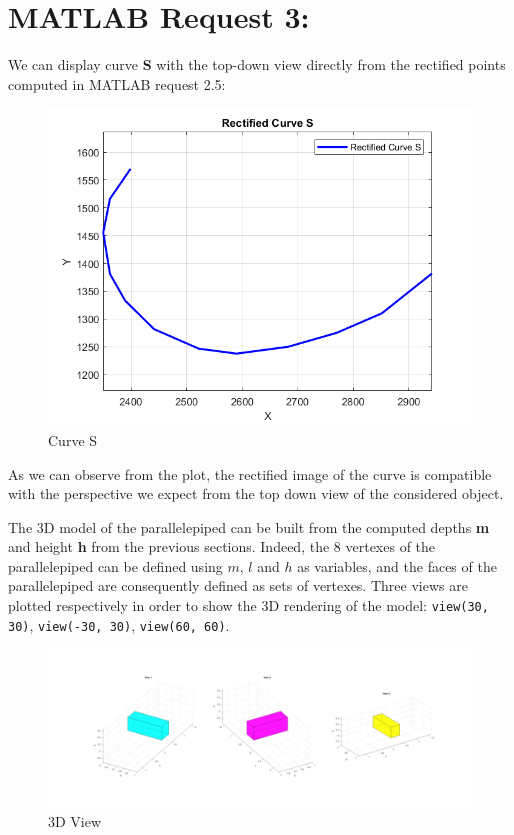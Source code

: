 \documentclass{Configuration_Files/PoliMi3i_thesis}
\begin{document}
\section{MATLAB Request 3: }
We can display curve \textbf{S} with the top-down view directly from the rectified points computed in MATLAB request 2.5:
\begin{figure}[H]
    \centering
    \includegraphics[width=0.5\linewidth]{Project Template/Images/s.png}
    \caption{Curve S}
    \label{fig:enter-label}
\end{figure}
As we can observe from the plot, the rectified image of the curve is compatible with the perspective we expect from the top down view of the considered object.

The 3D model of the parallelepiped can be built from the computed depths \textbf{m} and height \textbf{h} from the previous sections. Indeed, the 8 vertexes of the parallelepiped can be defined using $m$, $l$ and $h$ as variables, and the faces of the parallelepiped are consequently defined as sets of vertexes.
Three views are plotted respectively in order to show the 3D rendering of the model: \texttt{view(30, 30)}, \texttt{view(-30, 30)}, \texttt{view(60, 60)}.

\begin{figure}[H]
    \centering
    \includegraphics[width=1\linewidth]{Project Template/Images/3dview.png}
    \caption{3D View}
    \label{fig:enter-label}
\end{figure}
\end{document}
